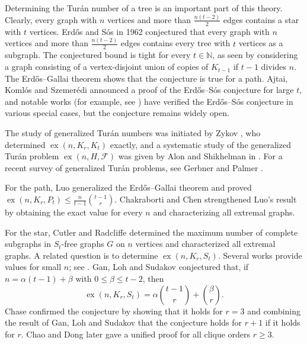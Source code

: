 \documentclass[11pt,a4paper]{article}
\newcommand{\ex}{\operatorname{ex}}
\begin{document}
Determining the Tur\'{a}n number of a tree is an important part of this theory. Clearly, every graph with $n$ vertices and more than $\frac{n(t-2)}{2}$ edges contains a star with $t$ vertices.
Erd\H{o}s and S\'{o}s \cite{erdos1962} in 1962 conjectured that every graph with $n$ vertices and more than $\frac{n(t-2)}{2}$ edges contains every tree with $t$ vertices as a subgraph.
The conjectured bound is tight for every $t\in\mathbb N$, as seen by considering a graph consisting of a vertex-disjoint union of copies of $K_{t-1}$ if $t-1$ divides $n$.
 The Erd\H{o}s--Gallai theorem \cite{1959Erdos} shows that the conjecture is true for a path.
 Ajtai, Koml\'{o}s and Szemer\'{e}di \cite{ajtai1994} announced a proof of the Erd\H{o}s--S\'{o}s conjecture for large $t$, and notable works (for example, see \cite{Brandt1996,goerlich2016,rozhon2019,besomi2019,Fan2013,Fan2007,Fan2019,sacle1997}) have verified the Erd\H{o}s--S\'{o}s conjecture in various special cases, but the conjecture remains widely open.








The study of generalized Tur\'{a}n numbers
 was initiated by Zykov \cite{zykov1949}, who determined $\ex(n,K_{r},K_{t})$ exactly, and
 a systematic study of the generalized Tur\'{a}n problem $\ex(n,H,\mathcal{F})$ was given by Alon and Shikhelman in \cite{alon2016}. For a recent survey of generalized Tur\'{a}n problems, see Gerbner and Palmer \cite{GP2026}.




For the path,
Luo \cite{luo2018maximum} generalized the Erd\H{o}s--Gallai theorem and proved $\ex(n,K_{r},P_{t})\leq \frac{n}{t-1}\binom{t-1}{r}$.
Chakraborti and Chen \cite{chakraborti2024exact} strengthened Luo's result by obtaining the exact value for every $n$ and characterizing all extremal graphs.

 For the star, Cutler and Radcliffe \cite{cutler2014maximum} determined the maximum number of complete subgraphs in $S_{t}$-free graphs $G$ on $n$ vertices and characterized all extremal graphs.
A related question is to determine $\ex(n,K_r,S_t)$.
Several works provide values for small $n$; see \cite{engbers2014counting,alexander2012,alexander2016,Law2013}.
Gan, Loh and Sudakov \cite{gan2015maximizing} conjectured that, if $n=\alpha(t-1)+\beta$ with $0\leq\beta\leq t-2$, then
\[
\ex(n,K_r,S_t)= \alpha\binom{t-1}{r}+\binom{\beta}{r}.
\]
Chase \cite{chase2020} confirmed the conjecture by showing that it holds for $r=3$ and combining the result of Gan, Loh and Sudakov \cite{gan2015maximizing} that the conjecture holds for $r+1$ if it holds for $r$.  Chao and Dong \cite{Chao2022} later gave a unified proof for all clique orders $r\ge3$.
\end{document}
